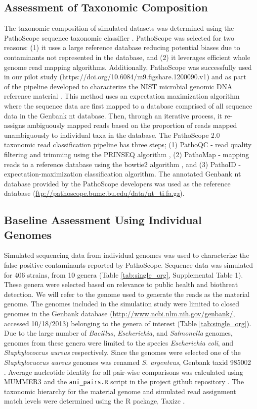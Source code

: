 \documentclass[fleqn,10pt,lineno]{wlpeerj}\usepackage[]{graphicx}\usepackage[]{color}
\begin{document}
\subsection*{Assessment of Taxonomic Composition}
The taxonomic composition of simulated datasets was determined using the PathoScope sequence taxonomic classifier \citep{Francis2013}.
PathoScope was selected for two reasons: (1) it uses a large reference database reducing potential biases due to contaminants not represented in the database, and (2) it leverages efficient whole genome read mapping algorithms. 
Additionally, PathoScope was successfully used in our pilot study (https://doi.org/10.6084/m9.figshare.1200090.v1) and as part of the pipeline developed to characterize the NIST microbial genomic DNA reference material \citep{olson2016pepr}. 
This method uses an expectation maximization algorithm where the sequence data are first mapped to a database comprised of all sequence data in the Genbank nt database. 
Then, through an iterative process, it re-assigns ambiguously mapped reads based on the proportion of reads mapped unambiguously to individual taxa in the database. 
The PathoScope 2.0 taxonomic read classification pipeline has three steps; (1) PathoQC - read quality filtering and trimming using the PRINSEQ algorithm \citep{schmieder2011quality}, (2) PathoMap - mapping reads to a reference database using the bowtie2 algorithm \citep{Langmead2012}, and (3) PathoID - expectation-maximization classification algorithm.
The annotated Genbank nt database provided by the PathoScope developers was used as the reference database (\url{ftp://pathoscope.bumc.bu.edu/data/nt\_ti.fa.gz}).

\subsection*{Baseline Assessment Using Individual Genomes}
Simulated sequencing data from individual genomes was used to characterize the false positive contaminants reported by PathoScope.
Sequence data was simulated for 406 strains, from 10 genera (Table \ref{tab:single_org}, Supplemental Table 1).
These genera were selected based on relevance to public health and biothreat detection.
We will refer to the genome used to generate the reads as the material genome.
The genomes included in the simulation study were limited to closed genomes in the Genbank database (\url{http://www.ncbi.nlm.nih.gov/genbank/}, accessed 10/18/2013) belonging to the genera of interest (Table \ref{tab:single_org}).
Due to the large number of \textit{Bacillus}, \textit{Escherichia}, and \textit{Salmonella} genomes, genomes from these genera were limited to the species \textit{Escherichia coli}, and \textit{Staphylococcus aureus} respectively. 
Since the genomes were selected one of the \textit{Staphylocuccus aureus} genomes was renamed \textit{S. argenteus}, Genbank taxid 985002 \citep{tong2015novel}. 
Average nucleotide identity for all pair-wise comparisons was calculated using MUMMER3 and the \verb|ani_pairs.R| script in the project github repository \citep{kurtz2004versatile}.
The taxonomic hierarchy for the material genome and simulated read assignment match levels were determined using the R package, Taxize \citep{TaxizeArticle,TaxizeManual}.
\end{document}
